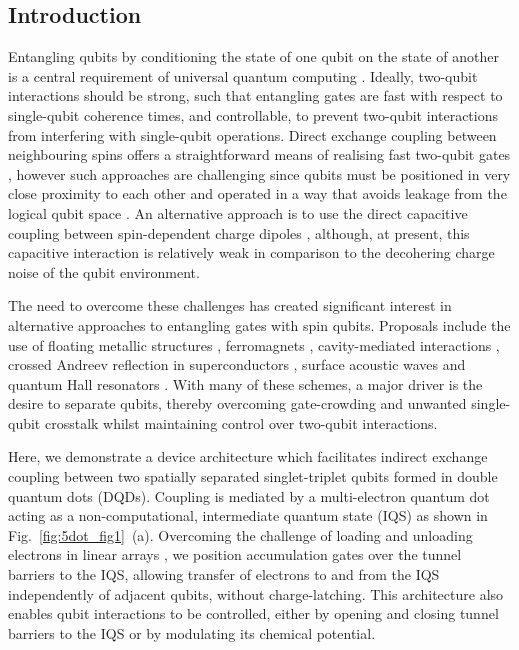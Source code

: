 \subsection{Introduction} 
Entangling qubits by conditioning the state of one qubit on the state of another is a central requirement of universal quantum computing \cite{divcrit1, divcrit2}. Ideally, two-qubit interactions should be strong, such that entangling gates are fast with respect to single-qubit coherence times, and controllable, to prevent two-qubit interactions from interfering with single-qubit operations.  Direct exchange coupling between neighbouring spins offers a straightforward means of realising fast two-qubit gates \cite{burkard,petta,silicontwoqubit,controlexchange}, however such approaches are challenging since qubits must be positioned in very close proximity to each other \cite{srinivasa} and operated in a way that avoids leakage from the logical qubit space \cite{wardrop,leakage}. An alternative approach is to use the direct capacitive coupling between spin-dependent charge dipoles \cite{Shulman202,weperen,taylornature}, although, at present, this capacitive interaction is relatively weak in comparison to the decohering charge noise of the qubit environment.

The need to overcome these challenges has created significant interest in alternative approaches to entangling gates with spin qubits. Proposals include the use of floating metallic structures \cite{floatinggate}, ferromagnets \cite{ferromagnet}, cavity-mediated interactions \cite{QED,petersson,dispersivewallraff}, crossed Andreev reflection in superconductors \cite{andreev}, surface acoustic waves \cite{SAWtheory,SAWexp,SAWexp2}  and quantum Hall resonators \cite{quantumhall, dohertyqhe}. With many of these schemes, a major driver is the desire to separate qubits, thereby overcoming gate-crowding and unwanted single-qubit crosstalk whilst maintaining control over two-qubit interactions. 

Here, we demonstrate a device architecture which facilitates indirect exchange coupling between two spatially separated singlet-triplet qubits formed in double quantum dots (DQDs). Coupling is mediated by a multi-electron quantum dot acting as a non-computational, intermediate quantum state (IQS) \cite{Malinowski, jelena1, bluhm, srinivasa} as shown in Fig.~\ref{fig:5dot_fig1}~(a). Overcoming the challenge of loading and unloading electrons in linear arrays \cite{tarucha5dot}, we position accumulation gates over the tunnel barriers to the IQS, allowing transfer of electrons to and from the IQS independently of adjacent qubits, without charge-latching. This architecture also enables qubit interactions to be controlled, either by opening and closing tunnel barriers to the IQS or by modulating its chemical potential.

